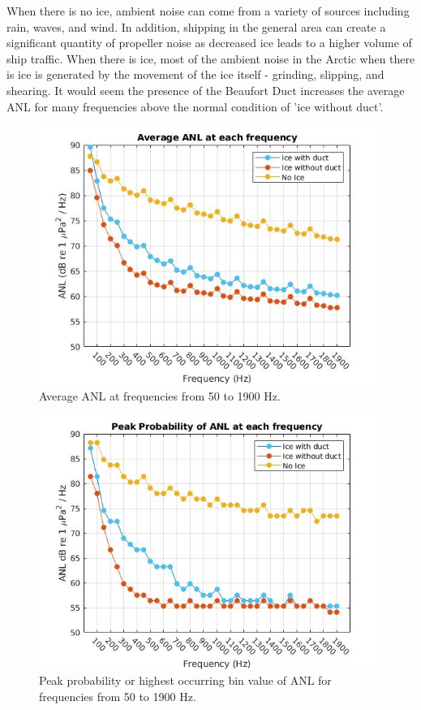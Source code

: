 When there is no ice, ambient noise can come from a variety of sources including rain, waves, and wind. In addition, shipping in the general area can create a significant quantity of propeller noise as decreased ice leads to a higher volume of ship traffic. \parencite{halliday2020potential} When there is ice, most of the ambient noise in the Arctic when there is ice is generated by the movement of the ice itself - grinding, slipping, and shearing. It would seem the presence of the Beaufort Duct increases the average ANL for many frequencies above the normal condition of 'ice without duct'. 



\begin{figure}[p]
\centering
\includegraphics[scale=0.6]{Figures/Average_ANL.jpg}
\caption{Average ANL at frequencies from 50 to 1900 Hz.}
\label{fig_avg_anl}
\end{figure}

\begin{figure}[p]
\centering
\includegraphics[scale=0.6]{Figures/peak_prob_ANL.jpg}
\caption{Peak probability or highest occurring bin value of ANL for frequencies from 50 to 1900 Hz.}
\label{fig_peak_prob}
\end{figure}

